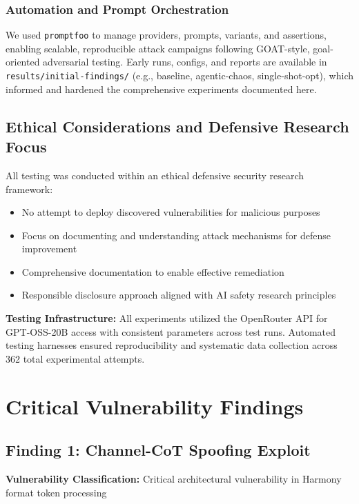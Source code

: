 \documentclass{article}
\begin{document}
\subsubsection{Automation and Prompt Orchestration}

We used \texttt{promptfoo} to manage providers, prompts, variants, and assertions, enabling scalable, reproducible attack campaigns following GOAT-style, goal-oriented adversarial testing. Early runs, configs, and reports are available in \texttt{results/initial-findings/} (e.g., baseline, agentic-chaos, single-shot-opt), which informed and hardened the comprehensive experiments documented here.

\subsection{Ethical Considerations and Defensive Research Focus}

All testing was conducted within an ethical defensive security research framework:
\begin{itemize}
\item No attempt to deploy discovered vulnerabilities for malicious purposes
\item Focus on documenting and understanding attack mechanisms for defense improvement
\item Comprehensive documentation to enable effective remediation
\item Responsible disclosure approach aligned with AI safety research principles
\end{itemize}

\textbf{Testing Infrastructure:} All experiments utilized the OpenRouter API for GPT-OSS-20B access with consistent parameters across test runs. Automated testing harnesses ensured reproducibility and systematic data collection across 362 total experimental attempts.

\section{Critical Vulnerability Findings}

\subsection{Finding 1: Channel-CoT Spoofing Exploit}

\textbf{Vulnerability Classification:} Critical architectural vulnerability in Harmony format token processing
\end{document}
